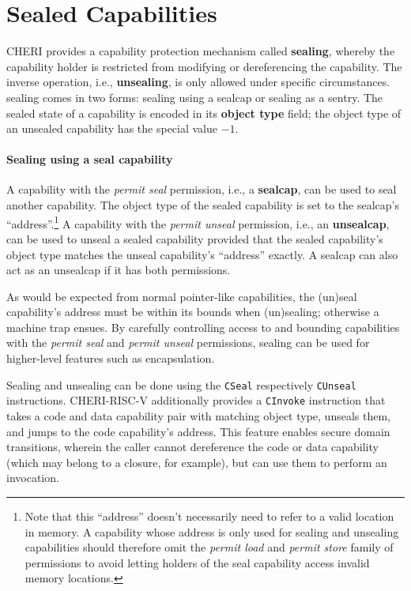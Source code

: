\documentclass[main.tex]{subfiles}
\begin{document}
\section{Sealed Capabilities}
CHERI provides a capability protection mechanism called \textbf{\gls{sealing}}, whereby the capability holder is restricted from modifying or dereferencing the capability. The inverse operation, i.e., \textbf{\gls{unsealing}}, is only allowed under specific circumstances. \Gls{sealing} comes in two forms: \gls{sealing} using a \gls{sealcap} or \gls{sealing} as a \gls{sentry}. The sealed state of a capability is encoded in its \textbf{object type} field; the object type of an unsealed capability has the special value $-1$.

\paragraph{Sealing using a seal capability} A capability with the \emph{permit seal} permission, i.e., a \textbf{\gls{sealcap}}, can be used to seal another capability. The object type of the sealed capability is set to the \gls{sealcap}'s \enquote{address}.\footnote{Note that this \enquote{address} doesn't necessarily need to refer to a valid location in memory. A capability whose address is only used for sealing and unsealing capabilities should therefore omit the \emph{permit load} and \emph{permit store} family of permissions to avoid letting holders of the seal capability access invalid memory locations.} A capability with the \emph{permit unseal} permission, i.e., an \textbf{\gls{unsealcap}}, can be used to unseal a sealed capability provided that the sealed capability's object type matches the unseal capability's \enquote{address} exactly. A \gls{sealcap} can also act as an \gls{unsealcap} if it has both permissions.

As would be expected from normal pointer-like capabilities, the (un)seal capability's address must be within its bounds when (un)sealing; otherwise a machine trap ensues. By carefully controlling access to and bounding capabilities with the \emph{permit seal} and \emph{permit unseal} permissions, sealing can be used for higher-level features such as encapsulation.

Sealing and unsealing can be done using the \texttt{CSeal} respectively \texttt{CUnseal} instructions. CHERI-RISC-V additionally provides a \texttt{CInvoke} instruction that takes a code and data capability pair with matching object type, unseals them, and jumps to the code capability's address. This feature enables secure domain transitions, wherein the caller cannot dereference the code or data capability (which may belong to a closure, for example), but can use them to perform an invocation.
\end{document}
